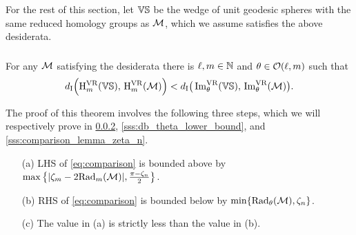 
For the rest of this section, let $\mathbb{VS}$ be the wedge of unit geodesic spheres with the same reduced homology groups as $\mathcal{M}$, which we assume satisfies the above desiderata.


\subsubsection{}

\medskip\theorem
For any $\mathcal{M}$ satisfying the desiderata there is $\ell, m \in \mathbb{N}$ and $\theta \in \mathcal{O}(\ell, m)$ such that
\begin{equation}\label{eq:comparison}
    d_{\mathrm{I}} \Big(\mathrm{H}^{\mathrm{VR}}_{m}(\mathbb{VS}),\, \mathrm{H}^{\mathrm{VR}}_{m}(\mathcal{M})\Big) < d_{\mathrm{I}} \big(\operatorname{Im}^{\mathrm{VR}}_{\theta}(\mathbb{VS}),\, \operatorname{Im}^{\mathrm{VR}}_{\theta}(\mathcal{M})\big).
\end{equation}

The proof of this theorem involves the following three steps, which we will respectively prove in \cref{sss:db_upper_bound}, \cref{sss:db_theta_lower_bound}, and \cref{sss:comparison_lemma_zeta_n}.
\begin{enumerate}
    \item [(a)] LHS of \cref{eq:comparison} is bounded above by $\max\big\{|\zeta_m  - 2\mathrm{Rad}_{m}(\mathcal{M}) |, \tfrac{\pi - \zeta_n}{2}\big\}$.
    \item [(b)] RHS of \cref{eq:comparison} is bounded below by $\min\{\mathrm{Rad}_{\theta}(\mathcal{M}), \zeta_n\}$.
    \item [(c)] The value in (a) is strictly less than the value in (b).
\end{enumerate}

\subsubsection{}\label{sss:db_upper_bound}

